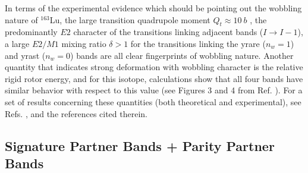 \documentclass[myclassdoc,debug]{rjparticle}
\begin{document}
In terms of the experimental evidence which should be pointing out the wobbling nature of $^{163}$Lu, the large transition quadrupole moment $Q_t \approx 10\ b$ \cite{gorgen2004quadrupole}, the predominantly $E2$ character of the transitions linking adjacent bands ($I\to I-1$), a large $E2/M1$ mixing ratio $\delta>1$ for the transitions linking the yrare ($n_w=1$) and yrast ($n_w=0$) bands are all clear fingerprints of wobbling nature. Another quantity that indicates strong deformation with wobbling character is the relative rigid rotor energy, and for this isotope, calculations show that all four bands have similar behavior with respect to this value (see Figures 3 and 4 from Ref. \cite{hagemann2005triaxiality}). For a set of results concerning these quantities (both theoretical and experimental), see Refs. \cite{raduta2017semiclassical,raduta2020new}, and the references cited therein. 

\subsection{Signature Partner Bands + Parity Partner Bands}
\label{subsection:w2}
\end{document}
